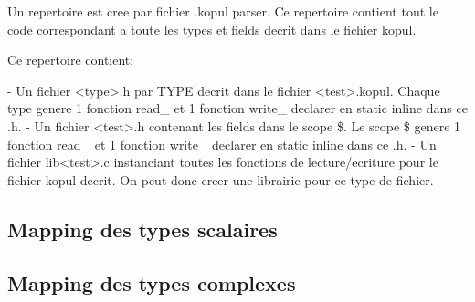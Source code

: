 \documentclass[11pt]{report}
\begin{document}
Un repertoire est cree par fichier .kopul parser.
Ce repertoire contient tout le code correspondant a toute les types et fields decrit dans le fichier kopul.

Ce repertoire contient:

- Un fichier <type>.h par TYPE decrit dans le fichier <test>.kopul.
Chaque type genere 1 fonction read\_ et 1 fonction write\_ declarer en static inline dans ce .h.
- Un fichier <test>.h contenant les fields dans le scope \$.
Le scope \$ genere 1 fonction read\_ et 1 fonction write\_ declarer en static inline dans ce .h.
- Un fichier lib<test>.c instanciant toutes les fonctions de lecture/ecriture pour le fichier kopul decrit.
On peut donc creer une librairie pour ce type de fichier.

\subsection{Mapping des types scalaires}

\subsection{Mapping des types complexes}
\end{document}
